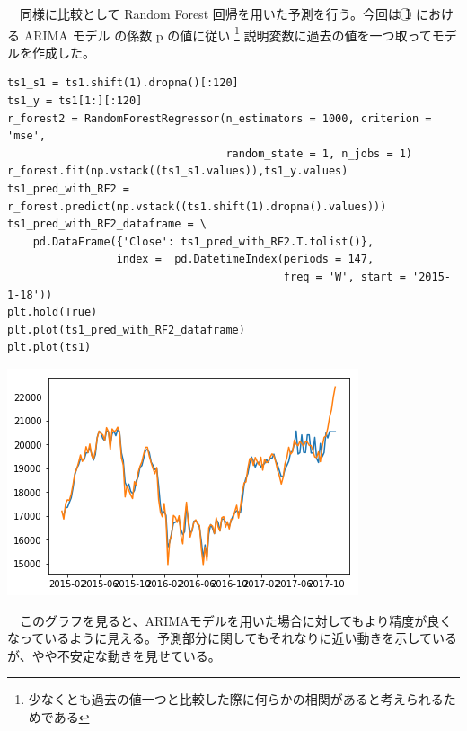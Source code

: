 \documentclass{scrartcl}
\begin{document}
　同様に比較として Random Forest 回帰を用いた予測を行う。今回は \textcircled{\scriptsize 1} における ARIMA モデル の係数 p の値に従い \footnote{少なくとも過去の値一つと比較した際に何らかの相関があると考えられるためである} 説明変数に過去の値を一つ取ってモデルを作成した。\\

\begin{verbatim}
ts1_s1 = ts1.shift(1).dropna()[:120]
ts1_y = ts1[1:][:120]
r_forest2 = RandomForestRegressor(n_estimators = 1000, criterion = 'mse',
                                  random_state = 1, n_jobs = 1)
r_forest.fit(np.vstack((ts1_s1.values)),ts1_y.values)
ts1_pred_with_RF2 = r_forest.predict(np.vstack((ts1.shift(1).dropna().values)))
ts1_pred_with_RF2_dataframe = \
    pd.DataFrame({'Close': ts1_pred_with_RF2.T.tolist()},
                 index =  pd.DatetimeIndex(periods = 147,
                                           freq = 'W', start = '2015-1-18'))
plt.hold(True)
plt.plot(ts1_pred_with_RF2_dataframe)
plt.plot(ts1)
\end{verbatim}

\begin{center}
\includegraphics[width=.9\linewidth]{./obipy-resources/YbLLZi.png}
\end{center}

　このグラフを見ると、ARIMAモデルを用いた場合に対してもより精度が良くなっているように見える。予測部分に関してもそれなりに近い動きを示しているが、やや不安定な動きを見せている。\\
\end{document}

